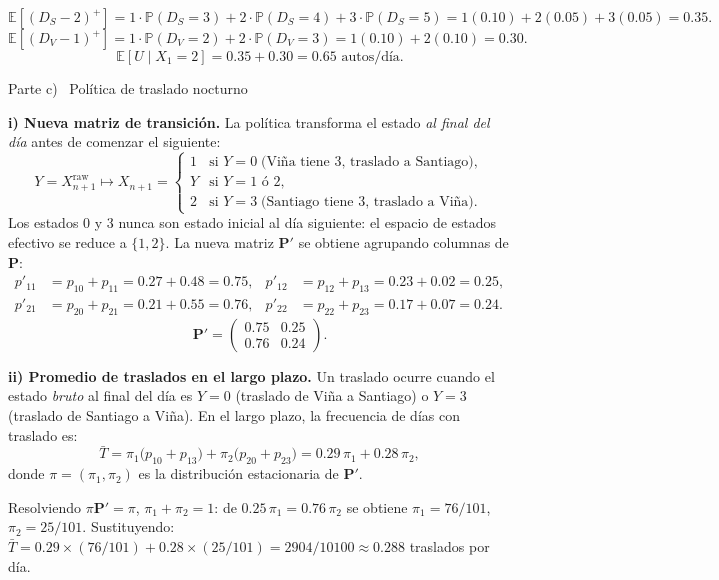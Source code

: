 \documentclass[10pt,a4paper]{article}
\newcommand{\Prob}[1]{\mathbb{P}\!\left(#1\right)}
\newcommand{\E}[1]{\mathbb{E}\!\left[#1\right]}
\newcommand{\parteheader}[1]{%
  \vspace{8pt}\needspace{4cm}\noindent
  \begin{tcolorbox}[
    colback=subsecbg!18, colframe=subsecbg!55,
    sharp corners, boxrule=0.4pt,
    left=6pt, right=6pt, top=3pt, bottom=3pt,
    fontupper=\small\bfseries\sffamily,
  ]
  #1
  \end{tcolorbox}\vspace{2pt}%
}
\newenvironment{nota}{\begin{tcolorbox}[notebox]}{\end{tcolorbox}}
\begin{document}
\[
  \E{(D_S-2)^+} = 1\cdot\Prob{D_S=3} + 2\cdot\Prob{D_S=4} + 3\cdot\Prob{D_S=5}
  = 1(0.10)+2(0.05)+3(0.05) = 0.35.
\]
\[
  \E{(D_V-1)^+} = 1\cdot\Prob{D_V=2} + 2\cdot\Prob{D_V=3}
  = 1(0.10)+2(0.10) = 0.30.
\]
\[
  \boxed{\E{U \mid X_1=2} = 0.35 + 0.30 = 0.65 \text{ autos/d\'ia.}}
\]

\parteheader{Parte c) \textperiodcentered\ Pol\'itica de traslado nocturno}

\textbf{i) Nueva matriz de transici\'on.}\quad
La pol\'itica transforma el estado \emph{al final del d\'ia} antes de comenzar el
siguiente:
\[
  Y = X_{n+1}^{\text{raw}} \mapsto X_{n+1} =
  \begin{cases}
    1 & \text{si } Y=0 \;\text{(Vi\~na tiene 3, traslado a Santiago)}, \\
    Y & \text{si } Y=1 \text{ \'o } 2,                                 \\
    2 & \text{si } Y=3 \;\text{(Santiago tiene 3, traslado a Vi\~na)}.
  \end{cases}
\]
Los estados 0 y 3 nunca son estado inicial al d\'ia siguiente: el espacio de
estados efectivo se reduce a $\{1,2\}$. La nueva matriz $\mathbf{P}'$ se obtiene
agrupando columnas de $\mathbf{P}$:
\begin{align*}
  p'_{11} & = p_{10}+p_{11} = 0.27+0.48 = 0.75, &
  p'_{12} & = p_{12}+p_{13} = 0.23+0.02 = 0.25,   \\
  p'_{21} & = p_{20}+p_{21} = 0.21+0.55 = 0.76, &
  p'_{22} & = p_{22}+p_{23} = 0.17+0.07 = 0.24.
\end{align*}
\[
  \mathbf{P}' = \begin{pmatrix} 0.75 & 0.25 \\ 0.76 & 0.24 \end{pmatrix}.
\]

\textbf{ii) Promedio de traslados en el largo plazo.}\quad
Un traslado ocurre cuando el estado \emph{bruto} al final del d\'ia es $Y=0$
(traslado de Vi\~na a Santiago) o $Y=3$ (traslado de Santiago a Vi\~na). En el largo
plazo, la frecuencia de d\'ias con traslado es:
\[
  \bar{T} = \pi_1\bigl(p_{10}+p_{13}\bigr) + \pi_2\bigl(p_{20}+p_{23}\bigr)
  = 0.29\,\pi_1 + 0.28\,\pi_2,
\]
donde $\pi=(\pi_1,\pi_2)$ es la distribuci\'on estacionaria de $\mathbf{P}'$.

\begin{nota}
  Resolviendo $\pi\mathbf{P}'=\pi$, $\pi_1+\pi_2=1$: de $0.25\,\pi_1=0.76\,\pi_2$
  se obtiene $\pi_1=76/101$, $\pi_2=25/101$. Sustituyendo:
  $\bar{T} = 0.29\times(76/101)+0.28\times(25/101) = 2904/10100 \approx 0.288$
  traslados por d\'ia.
\end{nota}
\end{document}
